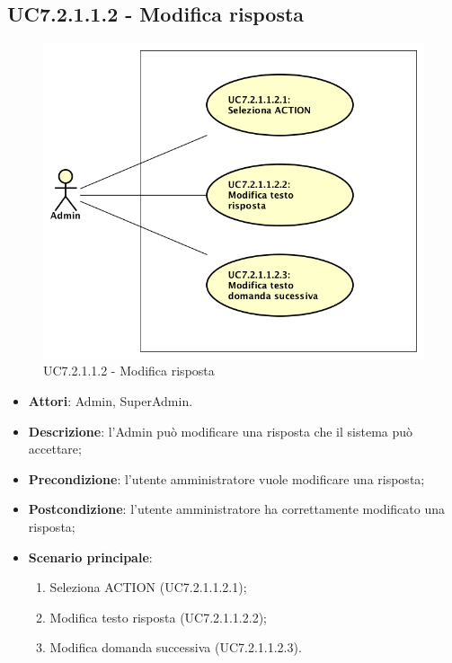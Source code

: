 \documentclass[../AnalisiDeiRequisiti_v4.0.0.tex]{subfiles}
\begin{document}
\begin{itemize}
\subsection{UC7.2.1.1.2 - Modifica risposta} 
\label{sssec:UC7.2.1.1.2} 
\begin{figure}[!h]
	\centering
	\includegraphics[scale=0.7]{UseCases/UC7_GestionePannelloAdmin/UC7_2_GestioneDomande/UC7_2_1_AggiungiDomanda/UC7_2_1_1_GestioneRisposte/UC7_2_1_1_2_ModificaRisposta/UC7_2_1_1_2_ModificaRisposta.png}
	\caption{UC7.2.1.1.2 - Modifica risposta}
\end{figure}
\begin{itemize} 
\item \textbf{Attori}: Admin, SuperAdmin.
\item \textbf{Descrizione}: l'Admin può modificare una risposta che il sistema può accettare;
\item \textbf{Precondizione}: l'utente amministratore vuole modificare una risposta;
\item \textbf{Postcondizione}: l'utente amministratore ha correttamente modificato una risposta;
\item \textbf{Scenario principale}: \begin{enumerate}\item Seleziona ACTION (UC7.2.1.1.2.1);\item Modifica testo risposta (UC7.2.1.1.2.2);\item Modifica domanda successiva (UC7.2.1.1.2.3).
\end{enumerate}
\end{itemize} 

\end{itemize}
\end{document}
